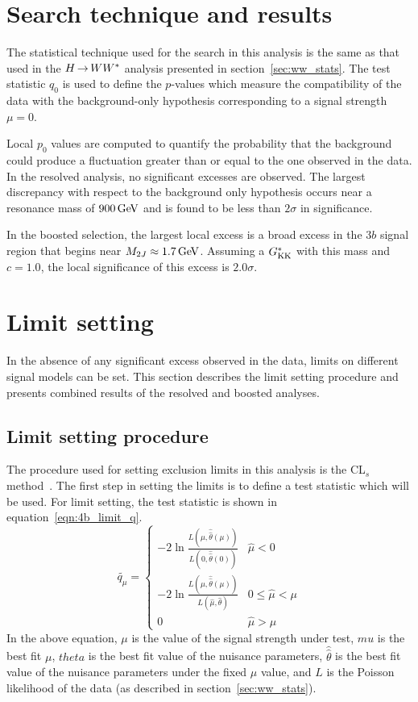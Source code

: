 \section{Search technique and results}

The statistical technique used for the search in this analysis is the same as that used in the $H{\,{\rightarrow}\,}WW^\ast$ analysis presented in section~\ref{sec:ww_stats}. The test statistic $q_0$ is used to define the $p$-values which measure the compatibility of the data with the background-only hypothesis corresponding to a signal strength $\mu = 0$. 

Local $p_0$ values are computed to quantify the probability that the background could produce a fluctuation greater than or equal to the one observed in the data. In the resolved analysis, no significant excesses are observed. The largest discrepancy with respect to the background only hypothesis occurs near a resonance mass of $900 \GeV$ and is found to be less than $2\sigma$ in significance.

In the boosted selection, the largest local excess is a broad excess in the $3b$ signal region that begins near $M_{2J} \approx 1.7 \GeV$. Assuming a $G^*_{\rm KK}$ with this mass and $c=1.0$, the local significance of this excess is $2.0 \sigma$. 

\section{Limit setting}

In the absence of any significant excess observed in the data, limits on different signal models can be set. This section describes the limit setting procedure and presents combined results of the resolved and boosted analyses. 

\subsection{Limit setting procedure}

The procedure used for setting exclusion limits in this analysis is the CL$_{s}$ method~\cite{CLS}. The first step in setting the limits is to define a test statistic which will be used. For limit setting, the test statistic is shown in equation~\ref{eqn:4b_limit_q}. 
%
\begin{equation}
\label{eqn:4b_limit_q}
  \widetilde{q_{\mu}} =
  \begin{cases}
    -2\ln \frac{L(\mu,\hat{\hat{\theta}}(\mu))}{L(0,\hat{\hat{\theta}}(0))} & \hat{\mu} < 0 \\
    -2\ln \frac{L(\mu,\hat{\hat{\theta}}(\mu))}{L(\hat{\mu},\hat{\theta})} & 0 \le \hat{\mu} < \mu \\
    0 & \hat{\mu} > \mu
  \end{cases} 
\end{equation}
%
In the above equation, $\mu$ is the value of the signal strength under test, $\hat{mu}$ is the best fit $\mu$, $\hat{theta}$ is the best fit value of the nuisance parameters, $\hat{\hat{\theta}}$ is the best fit value of the nuisance parameters under the fixed $\mu$ value, and $L$ is the Poisson likelihood of the data (as described in section~\ref{sec:ww_stats}). 

